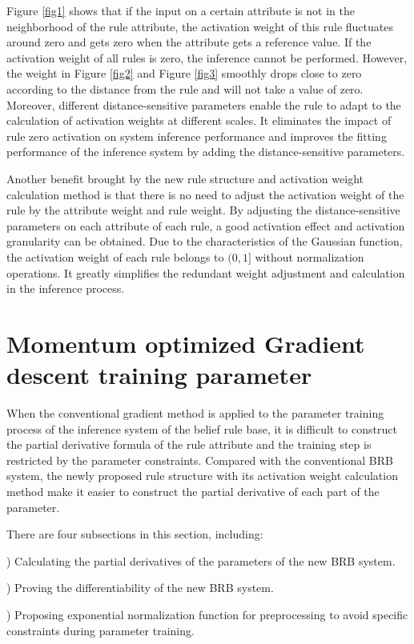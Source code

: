 \documentclass{ieeeaccess}
\begin{document}
Figure \ref{fig1} shows that if the input on a certain attribute is not in the neighborhood of the rule attribute,
the activation weight of this rule fluctuates around zero and gets zero when the attribute gets a reference value.
If the activation weight of all rules is zero, the inference cannot be performed.
However, the weight in Figure \ref{fig2} and Figure \ref{fig3} smoothly drops close to zero according to the distance from the rule and will not take a value of zero.
Moreover, different distance-sensitive parameters enable the rule to adapt to the calculation of activation weights at different scales.
It eliminates the impact of rule zero activation on system inference performance
and improves the fitting performance of the inference system by adding the distance-sensitive parameters.

Another benefit brought by the new rule structure and activation weight calculation method is that
there is no need to adjust the activation weight of the rule by the attribute weight and rule weight.
By adjusting the distance-sensitive parameters on each attribute of each rule, a good activation effect and activation granularity can be obtained.
Due to the characteristics of the Gaussian function, the activation weight of each rule belongs to $(0, 1]$ without normalization operations.
It greatly simplifies the redundant weight adjustment and calculation in the inference process.


\section{Momentum optimized Gradient descent training parameter}
When the conventional gradient method is applied to the parameter training process of the inference system of the belief rule base,
it is difficult to construct the partial derivative formula of the rule attribute and the training step is restricted by the parameter constraints.
Compared with the conventional BRB system, the newly proposed rule structure with its activation weight calculation method make it easier to construct the partial derivative of each part of the parameter.

There are four subsections in this section, including:

) Calculating the partial derivatives of the parameters of the new BRB system.

) Proving the differentiability of the new BRB system.

) Proposing exponential normalization function for preprocessing to avoid specific constraints during parameter training.
\end{document}
